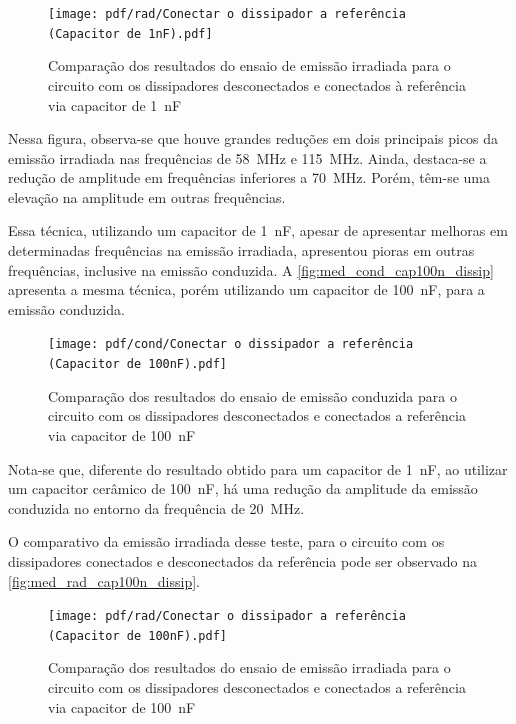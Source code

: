     \begin{figure}[H]
    	\centering
    	\caption{Comparação dos resultados do ensaio de emissão irradiada para o circuito com os dissipadores desconectados e conectados à referência via capacitor de \qty{1}{\nano\farad}}
    	\texttt{[image: pdf/rad/Conectar o dissipador a referência (Capacitor de 1nF).pdf]}
    	\label{fig:med_rad_cap1n_dissip}
    \end{figure}
    
    Nessa figura, observa-se que houve grandes reduções em dois principais picos da emissão irradiada nas frequências de \qty{58}{\mega\hertz} e \qty{115}{\mega\hertz}. Ainda, destaca-se a redução de amplitude em frequências inferiores a \qty{70}{\mega\hertz}. Porém, têm-se uma elevação na amplitude em outras frequências. 
    
    Essa técnica, utilizando um capacitor de \qty{1}{\nano\farad}, apesar de apresentar melhoras em determinadas frequências na emissão irradiada, apresentou pioras em outras frequências, inclusive na emissão conduzida. A \autoref{fig:med_cond_cap100n_dissip} apresenta a mesma técnica, porém utilizando um capacitor de \qty{100}{\nano\farad}, para a emissão conduzida.
    
    \begin{figure}[H]
    	\centering
    	\caption{Comparação dos resultados do ensaio de emissão conduzida para o circuito com os dissipadores desconectados e conectados a referência via capacitor de \qty{100}{\nano\farad}}
    	\texttt{[image: pdf/cond/Conectar o dissipador a referência (Capacitor de 100nF).pdf]}
    	\label{fig:med_cond_cap100n_dissip}
    \end{figure}
    
    Nota-se que, diferente do resultado obtido para um capacitor de \qty{1}{\nano\farad}, ao utilizar um capacitor cerâmico de \qty{100}{\nano\farad}, há uma redução da amplitude da emissão conduzida no entorno da frequência de \qty{20}{\mega\hertz}. 
    
    O comparativo da emissão irradiada desse teste, para o circuito com os dissipadores conectados e desconectados da referência pode ser observado na \autoref{fig:med_rad_cap100n_dissip}.
    
    \begin{figure}[H]
    	\centering
    	\caption{Comparação dos resultados do ensaio de emissão irradiada para o circuito com os dissipadores desconectados e conectados a referência via capacitor de \qty{100}{\nano\farad}}
    	\texttt{[image: pdf/rad/Conectar o dissipador a referência (Capacitor de 100nF).pdf]}
    	\label{fig:med_rad_cap100n_dissip}
    \end{figure}
    
